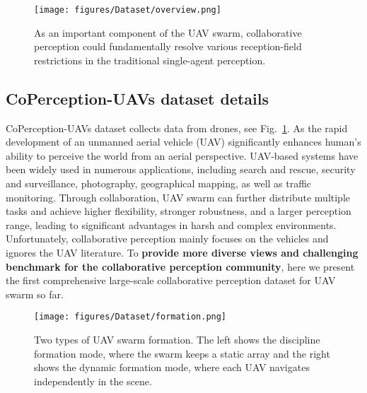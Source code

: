 \documentclass{article}
\begin{document}
\begin{figure}[t]
  \centering
\texttt{[image: figures/Dataset/overview.png]}
\vspace{-3mm}
   \caption{As an important component of the UAV swarm, collaborative perception  could fundamentally resolve various reception-field restrictions in the traditional single-agent perception.}
   \label{fig:overview}
    \vspace{-5mm}
\end{figure}


\subsection{CoPerception-UAVs dataset details}
CoPerception-UAVs dataset collects data from drones, see Fig.~\ref{fig:overview}. As the rapid development of an unmanned aerial vehicle (UAV) significantly enhances human’s ability to perceive the world from an aerial perspective. UAV-based systems have been widely used in numerous applications, including search and rescue, security and surveillance, photography, geographical mapping, as well as traffic monitoring. Through collaboration, UAV swarm can further distribute multiple tasks and achieve higher flexibility, stronger robustness, and a larger perception range, leading to significant advantages in harsh and complex environments. Unfortunately, collaborative perception mainly focuses on the vehicles and ignores the UAV literature. To \textbf{provide more diverse views and challenging benchmark for the collaborative perception community}, here we present the first comprehensive large-scale collaborative perception dataset for UAV swarm so far.



\begin{figure}[t]
  \centering
  \vspace{2mm}
\texttt{[image: figures/Dataset/formation.png]}
\vspace{-5mm}
   \caption{Two types of UAV swarm formation. The left shows the discipline formation mode, where the swarm keeps a static array and the right shows the dynamic formation mode, where each UAV navigates independently in the scene.}
   \label{fig:arrangement}
\vspace{-6mm}
\end{figure}
\end{document}
